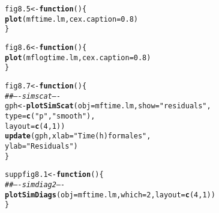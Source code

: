 \documentclass[12pt, a4paper,  BCOR=8.25mm, DIV=15]{scrartcl}\usepackage[]{graphicx}\usepackage[]{color}
\makeatletter
\newcommand{\hlnum}[1]{\textcolor[rgb]{0.686,0.059,0.569}{#1}}%
\newcommand{\hlstr}[1]{\textcolor[rgb]{0.192,0.494,0.8}{#1}}%
\newcommand{\hlcom}[1]{\textcolor[rgb]{0.678,0.584,0.686}{\textit{#1}}}%
\newcommand{\hlstd}[1]{\textcolor[rgb]{0.345,0.345,0.345}{#1}}%
\newcommand{\hlkwa}[1]{\textcolor[rgb]{0.161,0.373,0.58}{\textbf{#1}}}%
\newcommand{\hlkwb}[1]{\textcolor[rgb]{0.69,0.353,0.396}{#1}}%
\newcommand{\hlkwc}[1]{\textcolor[rgb]{0.333,0.667,0.333}{#1}}%
\newcommand{\hlkwd}[1]{\textcolor[rgb]{0.737,0.353,0.396}{\textbf{#1}}}%
\newenvironment{kframe}{%
 \def\at@end@of@kframe{}%
 \ifinner\ifhmode%
  \def\at@end@of@kframe{\end{minipage}}%
  \begin{minipage}{\columnwidth}%
 \fi\fi%
 \def\FrameCommand##1{\hskip\@totalleftmargin \hskip-\fboxsep
 \colorbox{shadecolor}{##1}\hskip-\fboxsep
     \hskip-\linewidth \hskip-\@totalleftmargin \hskip\columnwidth}%
 \MakeFramed {\advance\hsize-\width
   \@totalleftmargin\z@ \linewidth\hsize
   \@setminipage}}%
 {\par\unskip\endMakeFramed%
 \at@end@of@kframe}
\newenvironment{knitrout}{}{} %
\makeatother
\begin{document}
\begin{knitrout}
\color{fgcolor}\begin{kframe}
\begin{alltt}
\hlstd{fig8.5} \hlkwb{<-} \hlkwa{function}\hlstd{()\{}
\hlkwd{plot}\hlstd{(mftime.lm,} \hlkwc{cex.caption}\hlstd{=}\hlnum{0.8}\hlstd{)}
\hlstd{\}}
\end{alltt}
\end{kframe}
\end{knitrout}

\begin{knitrout}
\color{fgcolor}\begin{kframe}
\begin{alltt}
\hlstd{fig8.6} \hlkwb{<-} \hlkwa{function}\hlstd{()\{}
\hlkwd{plot}\hlstd{(mflogtime.lm,} \hlkwc{cex.caption}\hlstd{=}\hlnum{0.8}\hlstd{)}
\hlstd{\}}
\end{alltt}
\end{kframe}
\end{knitrout}

\begin{knitrout}
\color{fgcolor}\begin{kframe}
\begin{alltt}
\hlstd{fig8.7} \hlkwb{<-} \hlkwa{function}\hlstd{()\{}
\hlcom{## ---- simscat ----}
\hlstd{gph} \hlkwb{<-} \hlkwd{plotSimScat}\hlstd{(}\hlkwc{obj}\hlstd{=mftime.lm,} \hlkwc{show}\hlstd{=}\hlstr{"residuals"}\hlstd{,}
                   \hlkwc{type}\hlstd{=}\hlkwd{c}\hlstd{(}\hlstr{"p"}\hlstd{,}\hlstr{"smooth"}\hlstd{),}
                   \hlkwc{layout}\hlstd{=}\hlkwd{c}\hlstd{(}\hlnum{4}\hlstd{,}\hlnum{1}\hlstd{))}
\hlkwd{update}\hlstd{(gph,} \hlkwc{xlab}\hlstd{=}\hlstr{"Time (h) for males"}\hlstd{,}
      \hlkwc{ylab}\hlstd{=}\hlstr{"Residuals"}\hlstd{)}
\hlstd{\}}
\end{alltt}
\end{kframe}
\end{knitrout}

\begin{knitrout}
\color{fgcolor}\begin{kframe}
\begin{alltt}
\hlstd{suppfig8.1} \hlkwb{<-} \hlkwa{function}\hlstd{()\{}
\hlcom{## ---- simdiag2 ----}
\hlkwd{plotSimDiags}\hlstd{(}\hlkwc{obj}\hlstd{=mftime.lm,} \hlkwc{which}\hlstd{=}\hlnum{2}\hlstd{,} \hlkwc{layout}\hlstd{=}\hlkwd{c}\hlstd{(}\hlnum{4}\hlstd{,}\hlnum{1}\hlstd{))}
\hlstd{\}}
\end{alltt}
\end{kframe}
\end{knitrout}
\end{document}

